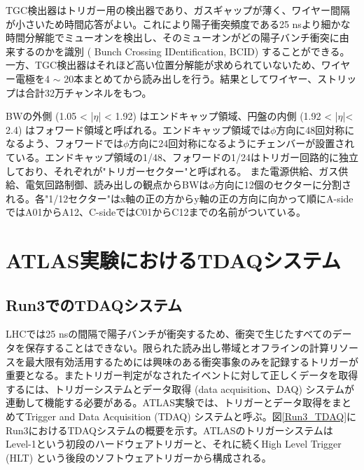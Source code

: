 TGC検出器はトリガー用の検出器であり、ガスギャップが薄く、ワイヤー間隔が小さいため時間応答がよい。これにより陽子衝突頻度である25 nsより細かな時間分解能でミューオンを検出し、そのミューオンがどの陽子バンチ衝突に由来するのかを識別 ( Bunch Crossing IDentification, BCID) することができる。一方、TGC検出器はそれほど高い位置分解能が求められていないため、ワイヤー電極を4 $\sim$ 20本まとめてから読み出しを行う。結果としてワイヤー、ストリップは合計32万チャンネルをもつ。

BWの外側  (1.05 < |$\eta$| < 1.92) はエンドキャップ領域、円盤の内側  (1.92 < |$\eta$|< 2.4) はフォワード領域と呼ばれる。エンドキャップ領域では$\phi$方向に48回対称になるよう、フォワードでは$\phi$方向に24回対称になるようにチェンバーが設置されている。エンドキャップ領域の1/48、フォワードの1/24はトリガー回路的に独立しており、それぞれが"トリガーセクター"と呼ばれる。
また電源供給、ガス供給、電気回路制御、読み出しの観点からBWは$\phi$方向に12個のセクターに分割される。各"1/12セクター"はx軸の正の方からy軸の正の方向に向かって順にA-sideではA01からA12、C-sideではC01からC12までの名前がついている。

\section{ATLAS実験におけるTDAQシステム}
\label{sec_TDAQ}
   
    \subsection{Run3でのTDAQシステム}
    \label{subsec_run3TDAQ}
    LHCでは25 nsの間隔で陽子バンチが衝突するため、衝突で生じたすべてのデータを保存することはできない。限られた読み出し帯域とオフラインの計算リソースを最大限有効活用するためには興味のある衝突事象のみを記録するトリガーが重要となる。またトリガー判定がなされたイベントに対して正しくデータを取得するには、トリガーシステムとデータ取得 (data acquisition、DAQ) システムが連動して機能する必要がある。ATLAS実験では、トリガーとデータ取得をまとめてTrigger and Data Acquisition (TDAQ) システムと呼ぶ。図\ref{Run3_TDAQ}にRun3におけるTDAQシステムの概要を示す。ATLASのトリガーシステムはLevel-1という初段のハードウェアトリガーと、それに続くHigh Level Trigger (HLT) という後段のソフトウェアトリガーから構成される。

